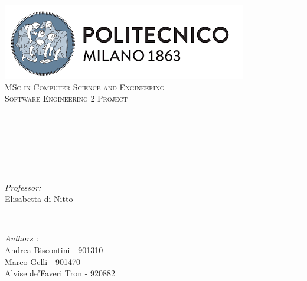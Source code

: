 \begin{titlepage}
	\centering
    \vspace*{0.5 cm}
    \includegraphics[scale = 0.75]{LaTeX/Images/PolimiLogo.png}\\[1.0 cm]	%
    \textsc{\LARGE MSc in Computer Science and Engineering}\\[2.0 cm]	%
	\textsc{\Large Software Engineering 2 Project}\\[0.5 cm]				%
	\rule{\linewidth}{0.2 mm} \\[0.4 cm]
	{ \huge \bfseries \thetitle}\\
	\rule{\linewidth}{0.2 mm} \\[1.5 cm]
	
	\begin{minipage}{0.4\textwidth}
		\begin{flushleft} \large
			\emph{Professor:}\\
			Elisabetta di Nitto\\
			\end{flushleft}
			\end{minipage}~
			\begin{minipage}{0.4\textwidth}
            
			\begin{flushright} \large
			\emph{Authors :} \\
			Andrea Biscontini - 901310\\
			Marco Gelli - 901470\\
			Alvise de'Faveri Tron - 920882\\
		\end{flushright}
        
	\end{minipage}\\[2 cm]
	
	
    
    
    
    
	
\end{titlepage}





